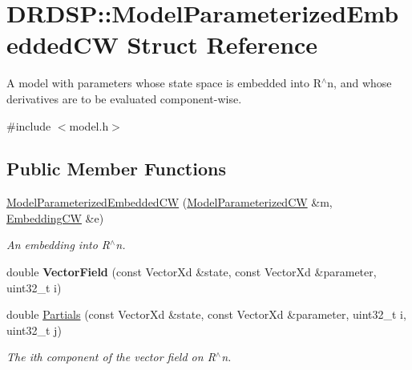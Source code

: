 \hypertarget{struct_d_r_d_s_p_1_1_model_parameterized_embedded_c_w}{\section{D\-R\-D\-S\-P\-:\-:Model\-Parameterized\-Embedded\-C\-W Struct Reference}
\label{struct_d_r_d_s_p_1_1_model_parameterized_embedded_c_w}
}


A model with parameters whose state space is embedded into R$^\wedge$n, and whose derivatives are to be evaluated component-\/wise.  




{\ttfamily \#include $<$model.\-h$>$}

\subsection*{Public Member Functions}
\begin{DoxyCompactItemize}
\item 
\hypertarget{struct_d_r_d_s_p_1_1_model_parameterized_embedded_c_w_a4744a0ef259bc046f7f06f2d49ff4756}{\hyperlink{struct_d_r_d_s_p_1_1_model_parameterized_embedded_c_w_a4744a0ef259bc046f7f06f2d49ff4756}{Model\-Parameterized\-Embedded\-C\-W} (\hyperlink{struct_d_r_d_s_p_1_1_model_parameterized_c_w}{Model\-Parameterized\-C\-W} \&m, \hyperlink{struct_d_r_d_s_p_1_1_embedding_c_w}{Embedding\-C\-W} \&e)}\label{struct_d_r_d_s_p_1_1_model_parameterized_embedded_c_w_a4744a0ef259bc046f7f06f2d49ff4756}

\begin{DoxyCompactList}\small\item\em An embedding into R$^\wedge$n. \end{DoxyCompactList}\item 
\hypertarget{struct_d_r_d_s_p_1_1_model_parameterized_embedded_c_w_a7a798d3588c97da4596db6625111201c}{double {\bfseries Vector\-Field} (const Vector\-Xd \&state, const Vector\-Xd \&parameter, uint32\-\_\-t i)}\label{struct_d_r_d_s_p_1_1_model_parameterized_embedded_c_w_a7a798d3588c97da4596db6625111201c}

\item 
\hypertarget{struct_d_r_d_s_p_1_1_model_parameterized_embedded_c_w_a9dd7e110f102eac42adcbd79877cfbd6}{double \hyperlink{struct_d_r_d_s_p_1_1_model_parameterized_embedded_c_w_a9dd7e110f102eac42adcbd79877cfbd6}{Partials} (const Vector\-Xd \&state, const Vector\-Xd \&parameter, uint32\-\_\-t i, uint32\-\_\-t j)}\label{struct_d_r_d_s_p_1_1_model_parameterized_embedded_c_w_a9dd7e110f102eac42adcbd79877cfbd6}

\begin{DoxyCompactList}\small\item\em The ith component of the vector field on R$^\wedge$n. \end{DoxyCompactList}\end{DoxyCompactItemize}
